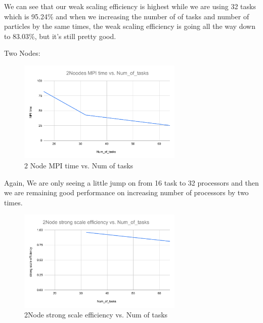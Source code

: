 \documentclass{article}
\begin{document}
We can see that our weak scaling efficiency is highest while we are using 32 tasks which is 95.24\% and when we increasing the number of of tasks and number of particles by the same times, the weak scaling efficiency is going all the way down to 83.03\%, but it's still pretty good.

Two Nodes:
\begin{figure}[H] %
\centering %
\includegraphics[width=0.7\textwidth]{figures/2Nodes MPI time vs. Num_of_tasks.pdf} %
\caption{2 Node MPI time vs. Num of tasks} %
\label{2 Nodes MPI time vs. Num_of_tasks} %
\end{figure}

Again, We are only seeing a little jump on from 16 task to 32 processors and then we are remaining good performance on increasing number of processors by two times.


\begin{figure}[H] %
\centering %
\includegraphics[width=0.7\textwidth]{figures/2Node strong scale efficiency vs. Num_of_tasks.pdf} %
\caption{2Node strong scale efficiency vs. Num of tasks} %
\label{2Node strong scale efficiency vs. Num_of_tasks} %
\end{figure}
\end{document}
